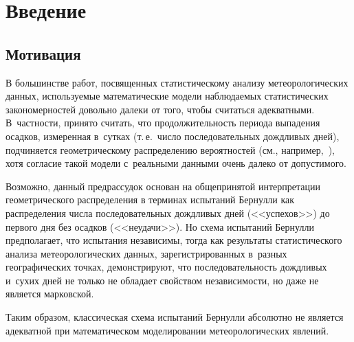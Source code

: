 



\thispagestyle{headings}

\begin{multicols}{2}

\label{st\stat}

\section{Введение}

\subsection{Мотивация}

В большинстве работ, посвященных статистическому анализу
метеорологических данных, используемые математические модели
наблюдаемых статистических закономерностей довольно далеки от того,
чтобы считаться адекватными. В~частности, принято считать, что
продолжительность периода выпадения осадков, измеренная в~сутках (т.\,е.\ 
чис\-ло последовательных дождливых дней), подчиняется
геометрическому распределению вероятностей (см., например,~\cite{Zolina2013}), хотя согласие такой модели с~реальными
данными очень далеко от допусти\-мого. 

Возможно, данный предрассудок
основан на общепринятой интерпретации гео\-мет\-ри\-че\-ско\-го распределения
в терминах испытаний Бернулли как распределения числа
последовательных дождливых дней (<<успехов>>) до первого дня без
осадков (<<неудачи>>). Но схема испытаний Бернулли предполагает, что
испытания независимы, тогда как результаты статистического анализа
метеорологических данных, зарегистрированных в~разных географических
точках, демонстрируют, что последовательность дождливых и~сухих дней
не только не обладает свойством независимости, но даже не является
марковской. 

Таким образом, классическая схема испытаний Бернулли
абсолютно не является адекватной при математическом моделировании
метеорологических явлений.


\end{multicols}
